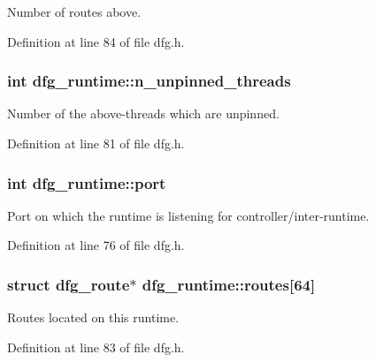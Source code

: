 Number of routes above. 



Definition at line 84 of file dfg.\-h.

\hypertarget{structdfg__runtime_ae9fb600da8228ad88cc06dfd863d980f}{
\subsubsection[{n\-\_\-unpinned\-\_\-threads}]{\setlength{\rightskip}{0pt plus 5cm}int dfg\-\_\-runtime\-::n\-\_\-unpinned\-\_\-threads}}\label{structdfg__runtime_ae9fb600da8228ad88cc06dfd863d980f}


Number of the above-\/threads which are unpinned. 



Definition at line 81 of file dfg.\-h.

\hypertarget{structdfg__runtime_a112f547c6913972fc06b6ff614995bf1}{
\subsubsection[{port}]{\setlength{\rightskip}{0pt plus 5cm}int dfg\-\_\-runtime\-::port}}\label{structdfg__runtime_a112f547c6913972fc06b6ff614995bf1}


Port on which the runtime is listening for controller/inter-\/runtime. 



Definition at line 76 of file dfg.\-h.

\hypertarget{structdfg__runtime_a1ad88caaa574b644201c1abccd94066a}{
\subsubsection[{routes}]{\setlength{\rightskip}{0pt plus 5cm}struct {\bf dfg\-\_\-route}$\ast$ dfg\-\_\-runtime\-::routes\mbox{[}64\mbox{]}}}\label{structdfg__runtime_a1ad88caaa574b644201c1abccd94066a}


Routes located on this runtime. 



Definition at line 83 of file dfg.\-h.


